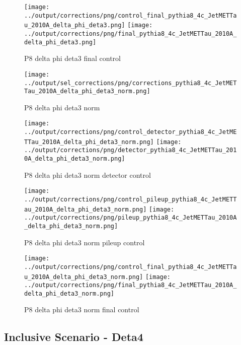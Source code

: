 \documentclass[11pt]{book}
\begin{document}
\begin{figure}[ht]
\centering
\texttt{[image: ../output/corrections/png/control\_final\_pythia8\_4c\_JetMETTau\_2010A\_delta\_phi\_deta3.png]}
\texttt{[image: ../output/corrections/png/final\_pythia8\_4c\_JetMETTau\_2010A\_delta\_phi\_deta3.png]}
\caption{P8 delta phi deta3 final control}
\label{fig:p8_JetMETTau_2010A_delta_phi_deta3_final_control}
\end{figure}


\begin{figure}[ht]
\centering
\texttt{[image: ../output/sel\_corrections/png/corrections\_pythia8\_4c\_JetMETTau\_2010A\_delta\_phi\_deta3\_norm.png]}
\caption{P8 delta phi deta3 norm}
\label{fig:p8_JetMETTau_2010A_delta_phi_deta3_norm}
\end{figure}

\begin{figure}[ht]
\centering
\texttt{[image: ../output/corrections/png/control\_detector\_pythia8\_4c\_JetMETTau\_2010A\_delta\_phi\_deta3\_norm.png]}
\texttt{[image: ../output/corrections/png/detector\_pythia8\_4c\_JetMETTau\_2010A\_delta\_phi\_deta3\_norm.png]}
\caption{P8 delta phi deta3 norm detector control}
\label{fig:p8_JetMETTau_2010A_delta_phi_deta3_norm_detector_control}
\end{figure}

\begin{figure}[ht]
\centering
\texttt{[image: ../output/corrections/png/control\_pileup\_pythia8\_4c\_JetMETTau\_2010A\_delta\_phi\_deta3\_norm.png]}
\texttt{[image: ../output/corrections/png/pileup\_pythia8\_4c\_JetMETTau\_2010A\_delta\_phi\_deta3\_norm.png]}
\caption{P8 delta phi deta3 norm pileup control}
\label{fig:p8_JetMETTau_2010A_delta_phi_deta3_norm_pileup_control}
\end{figure}


\begin{figure}[ht]
\centering
\texttt{[image: ../output/corrections/png/control\_final\_pythia8\_4c\_JetMETTau\_2010A\_delta\_phi\_deta3\_norm.png]}
\texttt{[image: ../output/corrections/png/final\_pythia8\_4c\_JetMETTau\_2010A\_delta\_phi\_deta3\_norm.png]}
\caption{P8 delta phi deta3 norm final control}
\label{fig:p8_JetMETTau_2010A_delta_phi_deta3_norm_final_control}
\end{figure}


\clearpage
\subsection{Inclusive Scenario - Deta4}
\end{document}
